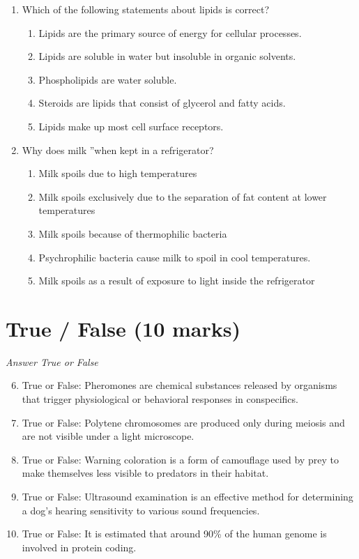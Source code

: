 \documentclass[12pt]{article}
\begin{document}
\begin{enumerate}[label=\arabic*.]
\begin{enumerate}[label=(\alph*)]
\end{enumerate}
\item Which of the following statements about lipids is correct?
\begin{enumerate}[label=(\alph*)]
    \item Lipids are the primary source of energy for cellular processes.
    \item Lipids are soluble in water but insoluble in organic solvents.
    \item Phospholipids are water soluble.
    \item Steroids are lipids that consist of glycerol and fatty acids.
    \item Lipids make up most cell surface receptors.
\end{enumerate}
\item Why does milk \textquotedblleftspoil\textquotedblright when kept in a refrigerator?
\begin{enumerate}[label=(\alph*)]
    \item Milk spoils due to high temperatures
    \item Milk spoils exclusively due to the separation of fat content at lower temperatures
    \item Milk spoils because of thermophilic bacteria
    \item Psychrophilic bacteria cause milk to spoil in cool temperatures.
    \item Milk spoils as a result of exposure to light inside the refrigerator
\end{enumerate}
\end{enumerate}

\section*{True / False (10 marks)}
\textit{Answer True or False}
\begin{enumerate}[label=\arabic*.]
\setcounter{enumi}{5}
\item True or False: Pheromones are chemical substances released by organisms that trigger physiological or behavioral responses in conspecifics.
\item True or False: Polytene chromosomes are produced only during meiosis and are not visible under a light microscope.
\item True or False: Warning coloration is a form of camouflage used by prey to make themselves less visible to predators in their habitat.
\item True or False: Ultrasound examination is an effective method for determining a dog's hearing sensitivity to various sound frequencies.
\item True or False: It is estimated that around 90\% of the human genome is involved in protein coding.
\end{enumerate}
\end{document}
